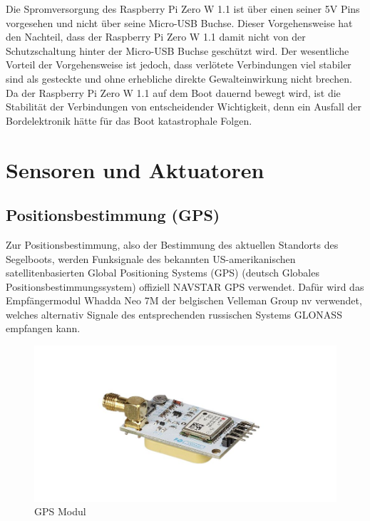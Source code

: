 Die Spromversorgung des Raspberry Pi Zero W 1.1 ist über einen seiner 5V Pins vorgesehen und nicht über seine Micro-USB Buchse. Dieser Vorgehensweise hat den Nachteil, dass der Raspberry Pi Zero W 1.1 damit nicht von der Schutzschaltung hinter der Micro-USB Buchse geschützt wird. Der wesentliche Vorteil der Vorgehensweise ist jedoch, dass verlötete Verbindungen viel stabiler sind als gesteckte und ohne erhebliche 
direkte Gewalteinwirkung nicht brechen. Da der Raspberry Pi Zero W 1.1 auf dem Boot dauernd bewegt wird, ist die Stabilität der Verbindungen von entscheidender Wichtigkeit, denn ein Ausfall der Bordelektronik hätte für das Boot katastrophale Folgen. 
\section{Sensoren und Aktuatoren}
\subsection{Positionsbestimmung (GPS)}
Zur Positionsbestimmung, also der Bestimmung des aktuellen Standorts des Segelboots, werden Funksignale des bekannten US-amerikanischen satellitenbasierten Global Positioning Systems (GPS) (deutsch Globales Positionsbestimmungssystem) offiziell NAVSTAR GPS verwendet. Dafür wird das Empfängermodul Whadda Neo 7M der belgischen Velleman Group nv verwendet, welches alternativ Signale des entsprechenden russischen Systems GLONASS empfangen kann.
\begin{figure}[H] 
    \centering
    \includegraphics[width=1\linewidth]{gps.png}
    \caption{GPS Modul}
    \label{fig:gps}
\end{figure}



